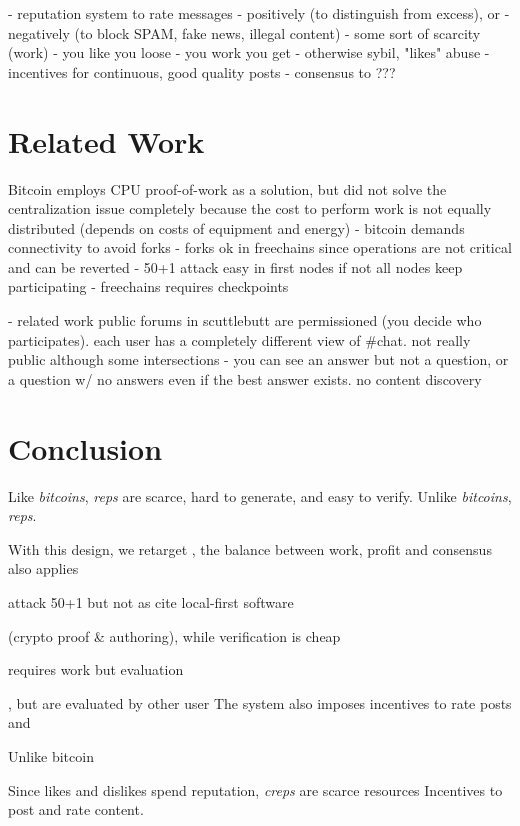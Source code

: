 \documentclass[10pt,journal,compsoc]{IEEEtran}
\newcommand{\reps}     {\emph{reps}\xspace}
\begin{document}
- reputation system to rate messages
    - positively (to distinguish from excess), or
    - negatively (to block SPAM, fake news, illegal content)
- some sort of scarcity (work)
    - you like you loose
    - you work you get
    - otherwise sybil, "likes" abuse
    - incentives for continuous, good quality posts
- consensus to ???

\section{Related Work}
\label{sec.related}

Bitcoin employs CPU proof-of-work as a solution, but did not solve the
centralization issue completely because the cost to perform work is not
equally distributed
(depends on costs of equipment and energy)
    - bitcoin demands connectivity to avoid forks
    - forks ok in freechains since operations are not critical and can be reverted
    - 50+1 attack easy in first nodes if not all nodes keep participating
        - freechains requires checkpoints

- related work public forums in scuttlebutt are permissioned (you decide who
  participates). each user has a completely different view of \#chat. not really
  public although some intersections
    - you can see an answer but not a question, or a question w/ no answers
      even if the best answer exists. no content discovery



\section{Conclusion}
\label{sec.conclusion}


Like \emph{bitcoins}, \reps are scarce, hard to generate, and easy to verify.
Unlike \emph{bitcoins}, \reps .


With this design, we retarget  , the balance between work, profit and consensus also applies 

attack 50+1 but not as
cite local-first software

 (crypto proof \& authoring),
while verification is cheap


requires work but evaluation


, but
are evaluated by other user
The system also imposes incentives to rate posts and 

Unlike bitcoin

Since likes and dislikes spend reputation, \emph{creps} are scarce resources
Incentives to post and rate content.
\end{document}
